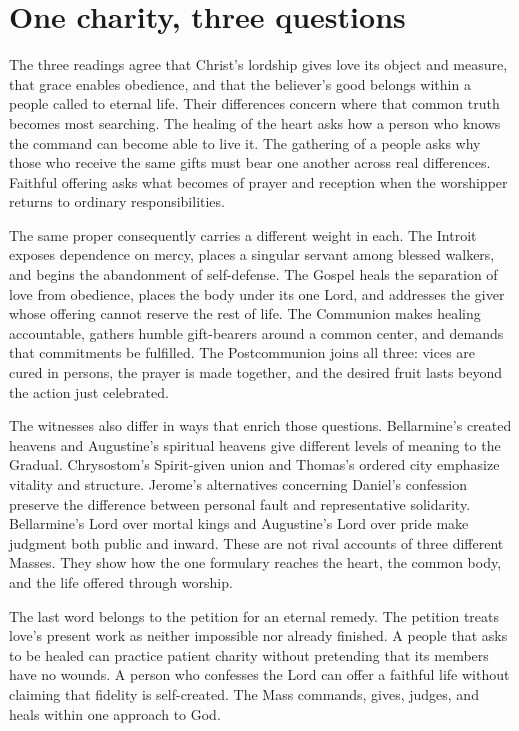 \section{One charity, three questions}

The three readings agree that Christ's lordship gives love its object and measure, that grace enables obedience, and that the believer's good belongs within a people called to eternal life. Their differences concern where that common truth becomes most searching. The healing of the heart asks how a person who knows the command can become able to live it. The gathering of a people asks why those who receive the same gifts must bear one another across real differences. Faithful offering asks what becomes of prayer and reception when the worshipper returns to ordinary responsibilities.

The same proper consequently carries a different weight in each. The Introit exposes dependence on mercy, places a singular servant among blessed walkers, and begins the abandonment of self-defense. The Gospel heals the separation of love from obedience, places the body under its one Lord, and addresses the giver whose offering cannot reserve the rest of life. The Communion makes healing accountable, gathers humble gift-bearers around a common center, and demands that commitments be fulfilled. The Postcommunion joins all three: vices are cured in persons, the prayer is made together, and the desired fruit lasts beyond the action just celebrated.

The witnesses also differ in ways that enrich those questions. Bellarmine's created heavens and Augustine's spiritual heavens give different levels of meaning to the Gradual. Chrysostom's Spirit-given union and Thomas's ordered city emphasize vitality and structure. Jerome's alternatives concerning Daniel's confession preserve the difference between personal fault and representative solidarity. Bellarmine's Lord over mortal kings and Augustine's Lord over pride make judgment both public and inward. These are not rival accounts of three different Masses. They show how the one formulary reaches the heart, the common body, and the life offered through worship.

The last word belongs to the petition for an eternal remedy. The petition treats love's present work as neither impossible nor already finished. A people that asks to be healed can practice patient charity without pretending that its members have no wounds. A person who confesses the Lord can offer a faithful life without claiming that fidelity is self-created. The Mass commands, gives, judges, and heals within one approach to God.
